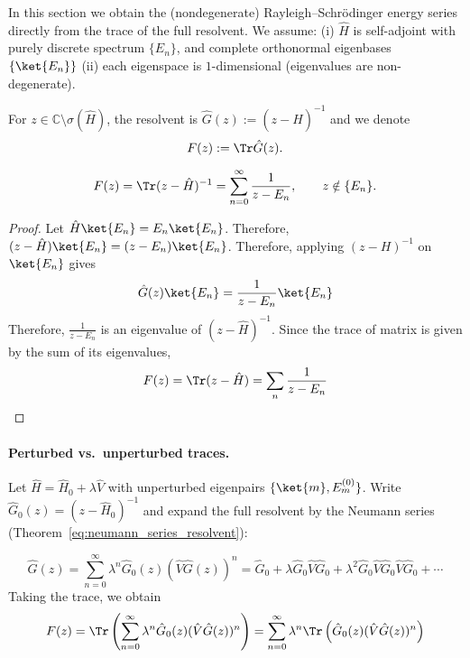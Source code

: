In this section we obtain the (nondegenerate) Rayleigh–Schrödinger
energy series directly from
the trace of the full resolvent. We assume:
(i) $\hat H$ is self-adjoint with purely discrete spectrum
$\{E_n\}$, and complete orthonormal eigenbases $\{\ket{E_n}\}$ (ii)
each eigenspace is $1$-dimensional (eigenvalues are non-degenerate).

\begin{definition}
  For $z\in\mathbb C\setminus \sigma(\hat H)$, the resolvent is $\hat
  G(z):=(z-\hat H)^{-1}$ and we denote
  \[
    F(z):=\Tr\hat G(z).
  \]
\end{definition}

\begin{proposition}\label{prop:trace_identity}
  \begin{equation}\label{eq:trace_resolvent_identity}
    F(z)=\Tr(z-\hat H)^{-1}=\sum_{n=0}^\infty \frac{1}{z-E_n},
    \qquad z\notin \{E_n\}.
  \end{equation}
\end{proposition}

\begin{proof}
  Let $\hat H \ket{E_n} = E_n \ket{E_n}$. Therefore, $(z - \hat
  H)\ket{E_n} = (z - E_n)\ket{E_n}$. Therefore, applying $(z -
  H)^{-1}$ on $\ket{E_n}$ gives
  \begin{equation}
    \hat G(z) \ket{E_n} = \frac{1}{z - E_n} \ket{E_n}
  \end{equation}
  Therefore, $\frac{1}{z - E_n}$ is an eigenvalue of $(z - \hat H)^{-1}$. Since
  the trace of matrix is given by the sum of its eigenvalues,
  \begin{equation}
    F(z) = \Tr (z - \hat H)  = \sum _{n} \frac{1}{z - E_n}
  \end{equation}
\end{proof}

\paragraph{Perturbed vs.\ unperturbed traces.}
Let $\hat H=\hat H_0+\lambda \hat V$ with unperturbed eigenpairs
$\{\ket{m},E_m^{(0)}\}$.
Write $\hat G_0(z)=(z-\hat H_0)^{-1}$ and expand the full resolvent
by the Neumann series (Theorem~\ref{eq:neumann_series_resolvent}):

\[
  \hat G(z) = \sum_{n=0}^\infty \lambda^n \hat G_0(z) (\hat V
  \hat G(z)) ^{n}=\hat G_0+\lambda \hat G_0 \hat V \hat G_0+\lambda^2 \hat
  G_0 \hat V \hat G_0 \hat V \hat G_0+\cdots
\]
Taking the trace, we obtain
\begin{equation}\label{eq:F_series_def}
  F(z)=\Tr \left(\sum_{n=0}^\infty \lambda^n \hat G_0(z) (\hat V
  \hat G(z)) ^{n}\right) = \sum_{n=0}^\infty \lambda^n \Tr \left(\hat
    G_0(z) (\hat V
  \hat G(z)) ^{n}\right)
\end{equation}

